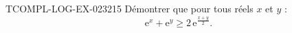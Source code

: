 \begin{exercice}{TCOMPL-LOG-EX-023}{2}{15}
Démontrer que pour tous réels $x$ et $y$ :
\[ \mathrm{e}^x + \mathrm{e}^y \geq 2\,\mathrm{e}^{\frac{x+y}{2}}. \]

\end{exercice}
